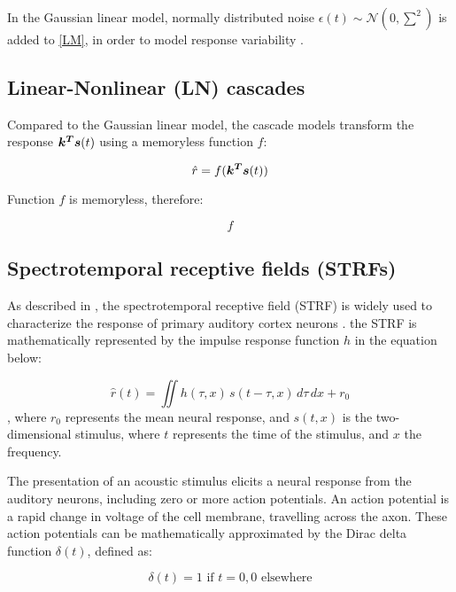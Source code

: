 In the Gaussian linear model, normally distributed noise $\epsilon(t) \sim \mathcal{N}(0, \sum^2)$ is added to \eqref{LM}, in order to model response variability \parencite{meyerModelsNeuronalStimulusResponse2017}.

\subsection{Linear-Nonlinear (LN) cascades}

Compared to the Gaussian linear model, the cascade models transform the response $\bm{k^T}\bm{s}(t)$ using a memoryless function $f$:

\begin{equation}
	\hat{r} = f(\bm{k^T}\bm{s}(t))
\end{equation}

Function $f$ is memoryless, therefore:

\begin{equation}
	f
\end{equation}

\subsection{Spectrotemporal receptive fields (STRFs)}

As described in \textcite{aertsenSpectrotemporalReceptiveFields1980}, the spectrotemporal receptive field (STRF) is widely used to characterize the response of primary auditory cortex neurons \parencite{ahrensNonlinearitiesContextualInfluences2008}. the STRF is mathematically represented by the impulse response function $h$ in the equation below:

\begin{equation}
	\hat{r}(t) = \iint h(\tau, x)\, s(t - \tau, x)\, d\tau\, dx + r_0
\end{equation}
\noindent , where $r_0$ represents the mean neural response, and $s(t, x)$ is the two-dimensional stimulus, where $t$ represents the time of the stimulus, and $x$ the frequency.

The presentation of an acoustic stimulus elicits a neural response from the auditory neurons, including zero or more action potentials. An action potential is a rapid change in voltage of the cell membrane, travelling across the axon. These action potentials can be mathematically approximated by the Dirac delta function $\delta(t)$, defined as:

\begin{equation}
	\delta(t) = 1 \textrm{ if } t=0, 0 \textrm{ elsewhere} 
\end{equation}

